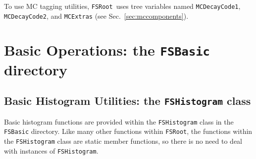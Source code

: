 \documentclass[11pt]{article}
\newcommand{\FSR}{{\tt FSRoot}}
\begin{document}
To use MC tagging utilities, \FSR\ uses tree variables named {\tt MCDecayCode1}, {\tt MCDecayCode2}, and {\tt MCExtras} (see Sec.~\ref{sec:mccomponents}).


\section{Basic Operations:  the {\tt FSBasic} directory}

\subsection{Basic Histogram Utilities: the {\tt FSHistogram} class}
\label{sec:hist}

Basic histogram functions are provided within the {\tt FSHistogram} class in the {\tt FSBasic} directory.  Like many other functions within \FSR, the functions within the {\tt FSHistogram} class are static member functions, so there is no need to deal with instances of {\tt FSHistogram}.
\end{document}
